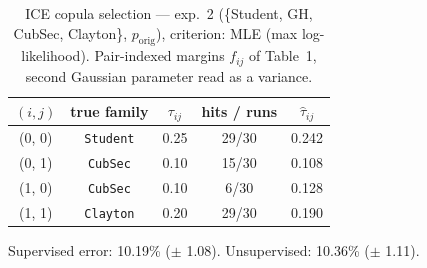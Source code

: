 \begin{table}[htbp]
  \centering
  \caption{ICE copula selection — exp.\ 2 (\{Student, GH, CubSec, Clayton\}, $p_{\text{orig}}$), criterion: MLE (max log-likelihood). Pair-indexed margins $f_{ij}$ of Table~1, second Gaussian parameter read as a variance.}
  \label{tab:exp3-exp2_orig_p__mle}
  \begin{tabular}{ccccc}
    \toprule
    $(i, j)$ & true family & $\tau_{ij}$ & hits / runs & $\hat\tau_{ij}$ \\
    \midrule
    (0, 0) & \texttt{Student} & 0.25 & 29/30 & 0.242 \\
    (0, 1) & \texttt{CubSec} & 0.10 & 15/30 & 0.108 \\
    (1, 0) & \texttt{CubSec} & 0.10 & 6/30 & 0.128 \\
    (1, 1) & \texttt{Clayton} & 0.20 & 29/30 & 0.190 \\
    \bottomrule
  \end{tabular}
  \par\smallskip Supervised error: 10.19\% ($\pm$ 1.08). Unsupervised: 10.36\% ($\pm$ 1.11).
\end{table}

